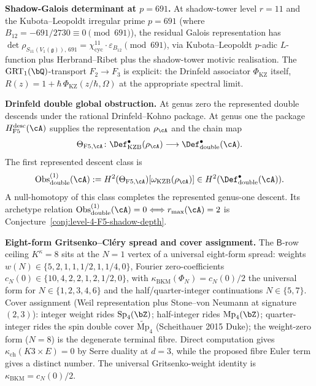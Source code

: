 \smallskip\noindent\textbf{Shadow-Galois determinant at $p=691$.}
At shadow-tower level $r=11$ and the Kubota--Leopoldt irregular prime
$p=691$ (where $B_{12}=-691/2730\equiv 0 \pmod{691}$), the residual
Galois representation has
$\det\rho_{S_{11}(V_1(\mathfrak g)),\,691} =
\chi_{\mathrm{cyc}}^{11}\cdot\varepsilon_{B_{12}} \pmod{691}$, via
Kubota--Leopoldt $p$-adic $L$-function plus Herbrand--Ribet plus the
shadow-tower motivic realisation. The $\mathrm{GRT}_1(\bQ)$-transport
$F_2\to F_3$ is explicit: the Drinfeld associator $\Phi_{\mathrm{KZ}}$
itself, $R(z)=1+\hbar\,\Phi_{\mathrm{KZ}}(z/\hbar,\Omega)$ at the
appropriate spectral limit.

\smallskip\noindent\textbf{Drinfeld double global obstruction.}
At genus zero the represented double descends under the rational
Drinfeld--Kohno package.  At genus one the package
$H_{\mathrm{F5}}^{\mathrm{desc}}(\cA)$ supplies the representation
$\rho_\cA$ and the chain map
\[
 \Theta_{\mathrm{F5},\cA}\colon
 \Def_{\mathrm{KZB}}^\bullet(\rho_\cA)
 \longrightarrow
 \Def_{\mathrm{double}}^\bullet(\cA).
\]
The first represented descent class is
\[
 \operatorname{Obs}^{(1)}_{\mathrm{double}}(\cA)
 :=H^2(\Theta_{\mathrm{F5},\cA})
 [\omega_{\mathrm{KZB}}(\rho_\cA)]
 \in H^2(\Def_{\mathrm{double}}^\bullet(\cA)).
\]
A null-homotopy of this class completes the represented genus-one
descent.  Its archetype relation
$\operatorname{Obs}^{(1)}_{\mathrm{double}}(\cA)=0
\Longleftrightarrow r_{\max}(\cA)=2$
is Conjecture~\ref{conj:level-4-F5-shadow-depth}.

\smallskip\noindent\textbf{Eight-form Gritsenko--Cl\'ery spread and
cover assignment.} The $\mathsf B$-row ceiling $K^\kappa=8$ sits at
the $N=1$ vertex of a universal eight-form spread: weights
$w(N)\in\{5,2,1,1,1/2,1,1/4,0\}$, Fourier zero-coefficients
$c_N(0)\in\{10,4,2,2,1,2,1/2,0\}$, with
$\kappa_{\mathrm{BKM}}(\Phi_N)=c_N(0)/2$ the universal form for
$N\in\{1,2,3,4,6\}$ and the half/quarter-integer continuations
$N\in\{5,7\}$. Cover assignment (Weil representation plus
Stone--von Neumann at signature $(2,3)$): integer weight rides
$\mathrm{Sp}_4(\bZ)$; half-integer rides $\mathrm{Mp}_4(\bZ)$;
quarter-integer rides the spin double cover
$\widetilde{\mathrm{Mp}}_4$ (Scheithauer 2015 Duke); the weight-zero
form ($N=8$) is the degenerate terminal fibre. Direct computation gives
$\kappa_{\mathrm{ch}}(K3\times E)=0$ by Serre duality at $d=3$,
while the proposed fibre Euler term gives a distinct number. The
universal Gritsenko-weight identity is
$\kappa_{\mathrm{BKM}}=c_N(0)/2$.

